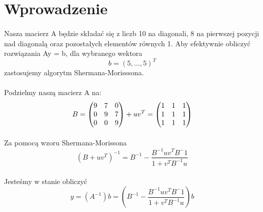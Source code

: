 \documentclass{article}
\begin{document}
\section{Wprowadzenie}

\paragraph{}

Nasza macierz A będzie składać się z liczb 10 na diagonali, 8 na pierwszej pozycji 
nad diagonalą oraz pozostałych elementów równych 1.  Aby efektywnie obliczyć rozwiązania 
Ay = b, dla wybranego wektora \begin{equation*}
 b = (5,...,5)^T
\end{equation*} zastosujemy algorytm Shermana-Morisssona.\\


\paragraph{}
Podzielmy naszą macierz A na: \\
\begin{equation*}
 \medskip
B = \begin{pmatrix}
    9 & 7 & 0 \\
    0 & 9 & 7 \\
    0 & 0 & 9 \\
    \end{pmatrix}
+
uv^T = \begin{pmatrix}
    1 & 1 & 1 \\
    1 & 1 & 1 \\
    1 & 1 & 1 \\
    \end{pmatrix}
\end{equation*}

\smallskip
\paragraph{}
Za pomocą wzoru Shermana-Morissona
 \begin{equation*}
 (B+uv^T)^{-1} = B^{-1} - \frac{B^{-1}uv^{T}B^-1}{1+v^{T}B^{-1} u}
\end{equation*}
\paragraph{}
Jesteśmy w stanie obliczyć
 \begin{equation*}
 y = (A^{-1})b =  (B^{-1} - \frac{B^{-1}uv^{T}B^-1}{1+v^{T}B^{-1} u})b
\end{equation*}
\end{document}
